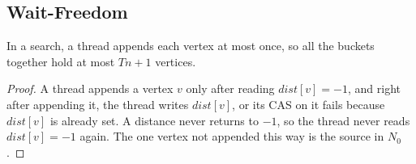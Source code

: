 \subsection{Wait-Freedom}
\label{sec:pf-waitfree}

\begin{lemma}[Appends]
\label{lem:once}
In a search, a thread appends each vertex at most once, so all the buckets together hold at most $Tn + 1$ vertices.
\end{lemma}
\begin{proof}
A thread appends a vertex $v$ only after reading $\mathit{dist}[v] = -1$, and right after appending it, the thread writes $\mathit{dist}[v]$, or its CAS on it fails because $\mathit{dist}[v]$ is already set. A distance never returns to $-1$, so the thread never reads $\mathit{dist}[v] = -1$ again. The one vertex not appended this way is the source in $N_0$.
\end{proof}

